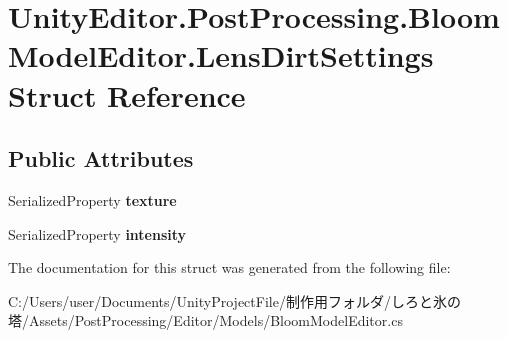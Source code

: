 \hypertarget{struct_unity_editor_1_1_post_processing_1_1_bloom_model_editor_1_1_lens_dirt_settings}{}\section{Unity\+Editor.\+Post\+Processing.\+Bloom\+Model\+Editor.\+Lens\+Dirt\+Settings Struct Reference}
\label{struct_unity_editor_1_1_post_processing_1_1_bloom_model_editor_1_1_lens_dirt_settings}
\subsection*{Public Attributes}
\begin{DoxyCompactItemize}
\item 
\mbox{\label{struct_unity_editor_1_1_post_processing_1_1_bloom_model_editor_1_1_lens_dirt_settings_aa2f90e90c96b15b6be5c050890c4e144}} 
Serialized\+Property {\bfseries texture}
\item 
\mbox{\label{struct_unity_editor_1_1_post_processing_1_1_bloom_model_editor_1_1_lens_dirt_settings_a141e1aeddf899e115bbf684979671db5}} 
Serialized\+Property {\bfseries intensity}
\end{DoxyCompactItemize}


The documentation for this struct was generated from the following file\+:\begin{DoxyCompactItemize}
\item 
C\+:/\+Users/user/\+Documents/\+Unity\+Project\+File/制作用フォルダ/しろと氷の塔/\+Assets/\+Post\+Processing/\+Editor/\+Models/Bloom\+Model\+Editor.\+cs\end{DoxyCompactItemize}
